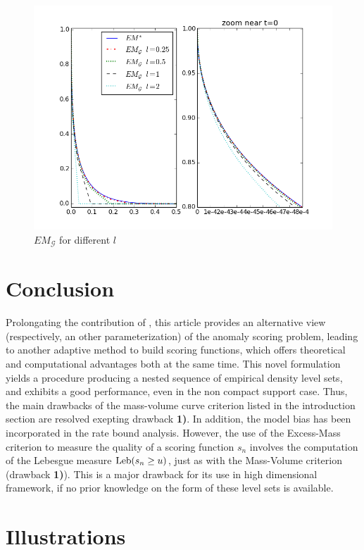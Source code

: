 \begin{figure}[!ht]
\includegraphics[width=\linewidth]{fig_source/EMG-EM.png}
\caption{$EM_\mathcal{G}$ for different $l$} %
\label{aistat:EMGEM}
\end{figure}


\section{Conclusion}
Prolongating the contribution of \cite{CLEM13}, this article provides an alternative view (respectively, an other parameterization) of the anomaly scoring problem, leading to another adaptive method to build scoring functions, which offers theoretical and computational advantages both at the same time. This novel formulation yields a procedure producing a nested sequence of empirical density level sets, and exhibits a good performance, even in the non compact support case. 
Thus, the main drawbacks of the mass-volume curve criterion listed in the introduction section are resolved exepting drawback \textbf{1)}. In addition, the model bias has been incorporated in the rate bound analysis.
%
However, the use of the Excess-Mass criterion to measure the quality of a scoring function $s_n$ involves the computation of the Lebesgue measure  $\text{Leb}(s_n \ge u)$, just as with the Mass-Volume criterion (drawback \textbf{1)}). This is a major drawback for its use in high dimensional framework, if no prior knowledge on the form of these level sets is available.


\section{Illustrations}

